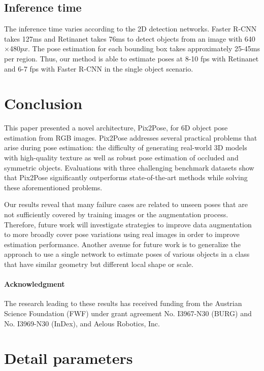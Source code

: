 \documentclass[10pt,twocolumn,letterpaper]{article}
\begin{document}
\subsection{Inference time} \label{inferencetime}
The inference time varies according to the 2D detection networks. Faster R-CNN takes 127ms and Retinanet takes 76ms to detect objects from an image with 640$\times$480$px$. The pose estimation for each bounding box takes approximately 25-45ms per region. Thus, our method is able to estimate poses at 8-10 fps with Retinanet and 6-7 fps with Faster R-CNN in the single object scenario.

\section{Conclusion} \label{conclusion}
This paper presented a novel architecture, Pix2Pose, for 6D object pose estimation from RGB images. Pix2Pose addresses several practical problems that arise during pose estimation: the difficulty of generating real-world 3D models with high-quality texture as well as robust pose estimation of occluded and symmetric objects. Evaluations with three challenging benchmark datasets show that Pix2Pose significantly outperforms state-of-the-art methods while solving these aforementioned problems.

Our results reveal that many failure cases are related to unseen poses that are not sufficiently covered by training images or the augmentation process. Therefore, future work will investigate strategies to improve data augmentation to more broadly cover pose variations using real images in order to improve estimation performance. Another avenue for future work is to generalize the approach to use a single network to estimate poses of various objects in a class that have similar geometry but different local shape or scale.

\small{\paragraph{Acknowledgment}
The research leading to these results has received funding from the Austrian Science Foundation (FWF) under grant agreement No. I3967-N30 (BURG) and No. I3969-N30 (InDex), and Aelous Robotics, Inc.}

{\small


}

\onecolumn
\appendix
\section{Detail parameters}
\end{document}
